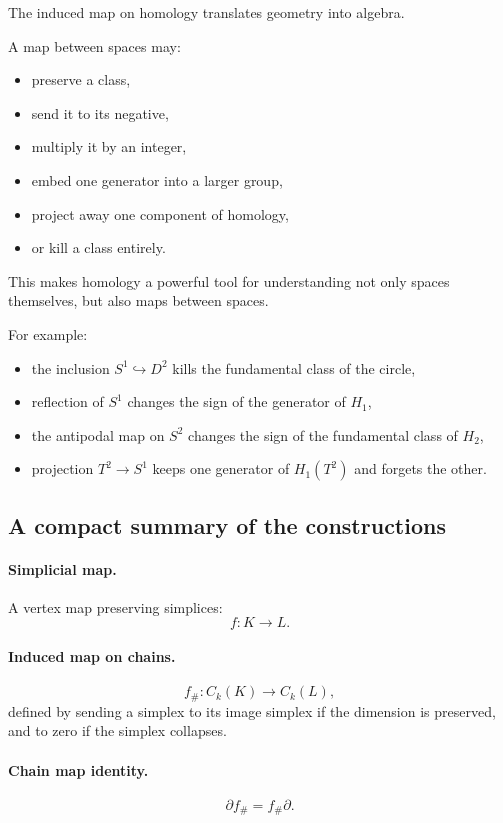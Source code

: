 \documentclass[12pt,a4paper]{article}
\theoremstyle{notespace}
\begin{document}
The induced map on homology translates geometry into algebra.

A map between spaces may:
\begin{itemize}
	\item preserve a class,
	\item send it to its negative,
	\item multiply it by an integer,
	\item embed one generator into a larger group,
	\item project away one component of homology,
	\item or kill a class entirely.
\end{itemize}

This makes homology a powerful tool for understanding not only spaces themselves, but also maps between spaces.

For example:
\begin{itemize}
	\item the inclusion \(S^1\hookrightarrow D^2\) kills the fundamental class of the circle,
	\item reflection of \(S^1\) changes the sign of the generator of \(H_1\),
	\item the antipodal map on \(S^2\) changes the sign of the fundamental class of \(H_2\),
	\item projection \(T^2\to S^1\) keeps one generator of \(H_1(T^2)\) and forgets the other.
\end{itemize}

\subsection{A compact summary of the constructions}

\paragraph{Simplicial map.}
A vertex map preserving simplices:
\[
f:K\to L.
\]

\paragraph{Induced map on chains.}
\[
f_\#:C_k(K)\to C_k(L),
\]
defined by sending a simplex to its image simplex if the dimension is preserved, and to zero if the simplex collapses.

\paragraph{Chain map identity.}
\[
\partial f_\# = f_\#\partial.
\]
\end{document}
